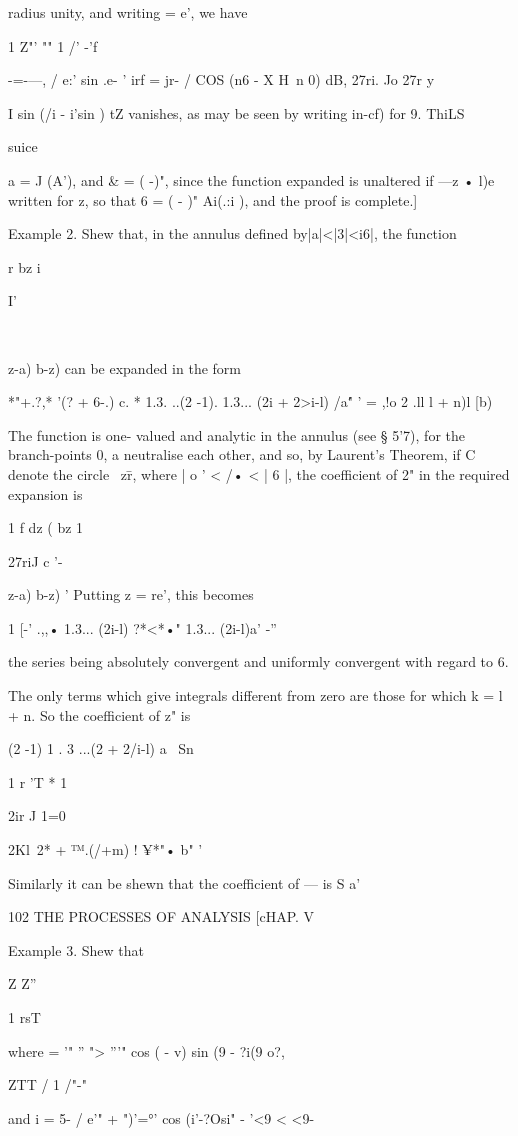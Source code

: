{{radius unity, and writing = e', we have

1 Z"' "" 1 /' -'f

 -=-—, / e:' sin .e- ' irf = jr- / COS (n6 - X H\ n 0) dB, 27ri. Jo
27r y

I sin (/i - i'sin ) tZ vanishes, as may be seen by writing in-cf) for
9. ThiLS

suice

a = J (A'), and \& = ( -)", since the function expanded is unaltered
if —z • l)e written for z, so that 6 = ( - )" Ai(.:i ), and the proof
is complete.]

Example 2. Shew that, in the annulus defined by|a|<|3|<i6|, the
function

r bz i

I'

\ \ {z-a) b-z) can be expanded in the form

*"+.?,* '(? + 6-.) c. * 1.3. ..(2 -1). 1.3... (2i + 2>i-l) /a\' " ' =
,!o 2 .ll l + n)l [b)

The function is one- valued and analytic in the annulus (see § 5'7),
for the branch-points 0, a neutralise each other, and so, by Laurent's
Theorem, if C denote the circle \ z\=r, where | o ' < /• < | 6 |, the
coefficient of 2" in the required expansion is

1 f dz ( bz 1

27riJ c '- \ \ {z-a) b-z) ' Putting z = re', this becomes

1 [-' .,,• 1.3... (2i-l) ?*<*•" 1.3... (2i-l)a' -''

the series being absolutely convergent and uniformly convergent with
regard to 6.

The only terms which give integrals different from zero are those for
which k = l + n. So the coefficient of z" is

(2 -1) 1 . 3 ...(2 + 2/i-l) a \ Sn

1 r 'T * 1

2ir J 1=0

2Kl\ 2* + ™.(/+m) ! ¥*"• b" '

Similarly it can be shewn that the coefficient of — is S a'\

102 THE PROCESSES OF ANALYSIS [cHAP. V

Example 3. Shew that

Z Z''

1 rsT

where = '" '' "> '''" cos ( - v) sin (9 - ?i(9 o?,

ZTT / 1 /"-"

and i = 5- / e'" + ")'=°' cos (i'-?Osi" - '<9 < <9-

}}}}
